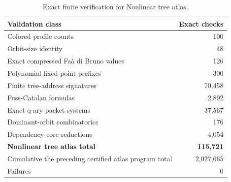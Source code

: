\begin{table}[htbp]
\centering
\caption{Exact finite verification for Nonlinear tree atlas.}
\label{tab:block11-validation}
\small
\begin{tabularx}{\textwidth}{@{}Y r@{}}
\toprule
Validation class & Exact checks\\
\midrule
Colored profile counts & 100\\
Orbit-size identity & 48\\
Exact compressed Faà di Bruno values & 126\\
Polynomial fixed-point prefixes & 300\\
Finite tree-address signatures & 70,458\\
Fuss-Catalan formulas & 2,892\\
Exact q-ary packet systems & 37,567\\
Dominant-orbit combinatorics & 176\\
Dependency-core reductions & 4,054\\
\midrule
\textbf{Nonlinear tree atlas total} & \textbf{115,721}\\
Cumulative the preceding certified atlas program total & 2,027,665\\
Failures & 0\\
\bottomrule
\end{tabularx}
\end{table}
